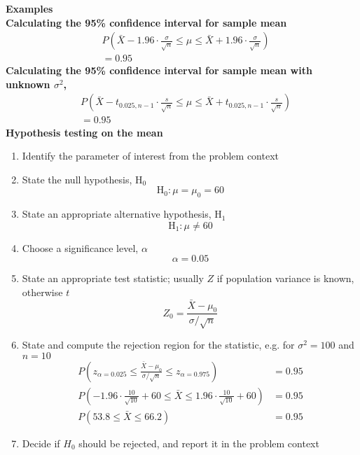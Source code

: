 \documentclass[a4paper]{article}
\newcommand{\heading}[1]{{\small\textbf{#1}}}
\newcommand{\subheading}[1]{{\scriptsize\textbf{#1}}}
\begin{document}
\begin{multicols*}{4}
\heading{Examples} \\
\subheading{Calculating the 95\% confidence interval for sample mean}
\begin{align*}
&P \left (
    \bar{X} - 1.96 \cdot \frac{\sigma}{\sqrt{n}} \leq
    \mu \leq
    \bar{X} + 1.96 \cdot \frac{\sigma}{\sqrt{n}}
    \right ) \\ 
&= 0.95
\end{align*}
\subheading{Calculating the 95\% confidence interval for sample mean 
with unknown $\sigma^2$,}
\begin{align*}
&P \left (
    \bar{X} - t_{0.025, n-1} \cdot \frac{s}{\sqrt{n}} \leq
    \mu \leq
    \bar{X} + t_{0.025, n-1} \cdot \frac{s}{\sqrt{n}}
    \right ) \\ 
&= 0.95
\end{align*}
\subheading{Hypothesis testing on the mean}
\begin{enumerate} \itemsep -0.5em
    \item Identify the parameter of interest from the problem context
    \item State the null hypothesis, $\mathrm{H}_0$
        $$\mathrm{H}_0: \mu = \mu_0 = 60$$
    \item State an appropriate alternative hypothesis, $\mathrm{H}_1$
        $$\mathrm{H}_1: \mu \neq 60$$
    \item Choose a significance level, $\alpha$
        $$\alpha = 0.05$$
    \item State an appropriate test statistic; usually $Z$ if population
        variance is known, otherwise $t$
        $$Z_0 = \frac{\bar{X}-\mu_0}{\sigma/\sqrt{n}}$$
    \item State and compute the rejection region for the statistic, 
        e.g. for $\sigma^2 = 100$ and $n = 10$
        \begin{align*}
            P(z_{\alpha=0.025} \leq
                \frac{\bar{X}-\mu_0}{\sigma/\sqrt{n}} \leq
                z_{\alpha=0.975}) &= 0.95 \\
            P(-1.96 \cdot \frac{10}{\sqrt{10}} + 60 \leq
                \bar{X} \leq
                1.96 \cdot \frac{10}{\sqrt{10}} + 60) &= 0.95 \\
            P(53.8 \leq \bar{X} \leq 66.2) &= 0.95
        \end{align*}
    \item Decide if $H_0$ should be rejected, and report it in the
        problem context
\end{enumerate}

\end{multicols*}
\end{document}
